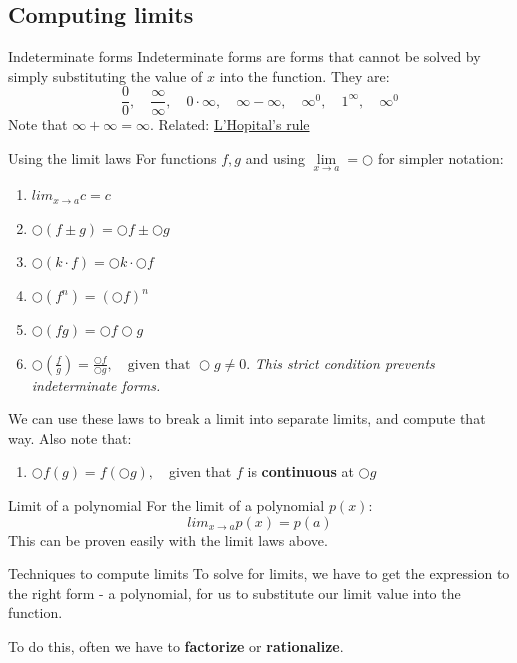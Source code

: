 \documentclass{article}
\begin{document}
\subsection{Computing limits}
\label{sec:indeterminate}
\begin{definition}
    {Indeterminate forms}
    Indeterminate forms are forms that cannot be solved by simply substituting the value of $x$ into the function. They are:
    \[\frac{0}{0},\quad\frac{\infty}{\infty},\quad0\cdot\infty,\quad\infty-\infty,\quad\infty^0,\quad1^\infty,\quad\infty^0\]
    Note that $\infty + \infty = \infty$. Related: \hyperref[sec:lhr]{L'Hopital's rule}
\end{definition}
\begin{theorem}
    {Using the limit laws}
    For functions $f,g$ and using $\mathop {\lim }\limits_{x \to a}=\bigcirc$ for simpler notation:
    \begin{enumerate}
        \item $lim_{x\to a}c=c$
        \item $\bigcirc(f\pm g)=\bigcirc f\pm \bigcirc g$
        \item $\bigcirc(k\cdot f)=\bigcirc k\cdot\bigcirc f$
        \item $\bigcirc(f^n)=(\bigcirc f)^n$
        \item $\bigcirc(fg)=\bigcirc f\bigcirc g$
        \item $\bigcirc(\frac{f}{g})=\frac{\bigcirc f}{\bigcirc g},\quad\text{given that }\bigcirc g\ne 0$. \emph{This strict condition prevents indeterminate forms.}
    \end{enumerate}
    We can use these laws to break a limit into separate limits, and compute that way. Also note that:
    \begin{enumerate}[start=7]
        \item $\bigcirc f(g)=f(\bigcirc g),\quad$given that $f$ is \textbf{continuous} at $\bigcirc g$
    \end{enumerate}
\end{theorem}
\begin{theorem}
    {Limit of a polynomial}
    For the limit of a polynomial $p(x)$:
    \[lim_{x\to a}p(x)=p(a)\]
    This can be proven easily with the limit laws above.
\end{theorem}
\begin{knBox}
    {Techniques to compute limits}
    To solve for limits, we have to get the expression to the right form - a polynomial, for us to substitute our limit value into the function.

    To do this, often we have to \textbf{factorize} or \textbf{rationalize}.
\end{knBox}
\end{document}
